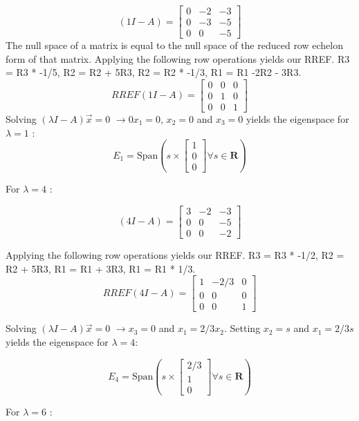 \documentclass{article}\usepackage[]{graphicx}\usepackage[]{xcolor}
\begin{document}
\[ (1 I - A) =
\left[ 
\begin{array}{ccc}
0 & -2 & -3\\
0 & -3 & -5\\
0 & 0 & -5
\end{array} 
\right] 
\]
\noindent The null space of a matrix is equal to the null space of the reduced row echelon form of that matrix. Applying the following row operations yields our RREF. R3 = R3 * -1/5, R2 = R2 + 5R3,  R2 = R2 * -1/3, R1 = R1 -2R2 - 3R3.
\[RREF(1I - A) = 
\left[
\begin{array}{ccc}
0 & 0 & 0\\
0 & 1 & 0\\
0 & 0 & 1
\end{array} 
\right] 
\]
Solving $(\lambda I - A)\vec{x} = 0$ $\rightarrow 0x_{1} = 0$, $x_{2} = 0$ and $x_{3} = 0$ yields the eigenspace for $\lambda = 1$ :
\[ E_{1} = \mbox{Span}
\left(
s\times
\left[
\begin{array}{c}
1\\
0\\
0
\end{array}
\right]
\forall s \in \mathbf{R}
\right)
\]

\noindent For $\lambda = 4$ :
 
\[ (4I - A) =
\left[
\begin{array}{ccc}
3 & -2 & -3\\
0 & 0 & -5\\
0 & 0 & -2
\end{array}
\right]
\]

\noindent Applying the following row operations yields our RREF. R3 = R3 * -1/2, R2 = R2 + 5R3, R1 = R1 + 3R3, R1 = R1 * 1/3.
\[RREF(4I - A) =
\left[
\begin{array}{ccc}
1 & -2/3 & 0\\
0 & 0 & 0\\
0 & 0 & 1
\end{array}
\right]
\]

\noindent Solving $(\lambda I - A)\vec{x} = 0$ $\rightarrow x_{3} = 0$ and $x_{1} = 2/3 x_{2}$. Setting $x_{2} =s$ and $x_{1} = 2/3s$ yields the eigenspace for $\lambda = 4$:

\[ E_{4} = \mbox{Span}
\left(
s\times
\left[
\begin{array}{c}
2/3\\
1\\
0
\end{array}
\right]
\forall s \in \mathbf{R}
\right)
\]

\noindent For $\lambda = 6$ :
 
\end{document}
